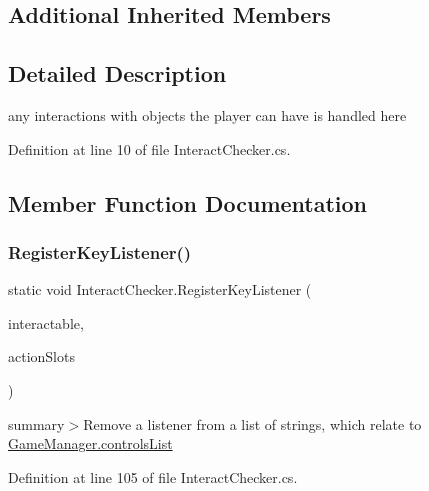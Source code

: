 \subsection*{Additional Inherited Members}


\subsection{Detailed Description}
any interactions with objects the player can have is handled here 



Definition at line 10 of file Interact\+Checker.\+cs.



\subsection{Member Function Documentation}
\mbox{\label{class_interact_checker_ae319eab732fd4bdb6e5d7689228531ee}} 
\subsubsection{\texorpdfstring{Register\+Key\+Listener()}{RegisterKeyListener()}}
{\footnotesize\ttfamily static void Interact\+Checker.\+Register\+Key\+Listener (\begin{DoxyParamCaption}\item[{\mbox{\hyperlink{interface_i_interactable}{I\+Interactable}}}]{interactable,  }\item[{List$<$ string $>$}]{action\+Slots }\end{DoxyParamCaption})\hspace{0.3cm}{\ttfamily [static]}}



summary$>$Remove a listener from a list of strings, which relate to \mbox{\hyperlink{class_game_manager_aa59964143f46f6d366aa576ab08c5a15}{Game\+Manager.\+controls\+List}}



Definition at line 105 of file Interact\+Checker.\+cs.

\mbox{\label{class_interact_checker_ac2a87fa80a10b82394bf81b6658c5ee6}} 
